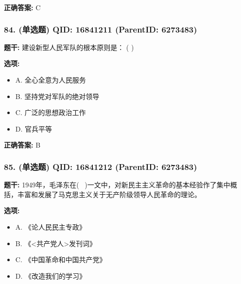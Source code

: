 \documentclass[12pt,UTF8]{ctexart}
\begin{document}
\textbf{正确答案:}
C

\vspace{0.3em}\hrulefill\vspace{0.7em}

\subsubsection*{84. (单选题) \small QID: 16841211 (ParentID: 6273483)}

\textbf{题干:}
建设新型人民军队的根本原则是： ( )



\textbf{选项:}
\begin{itemize}[leftmargin=*]

  \item A. 全心全意为人民服务

  \item B. 坚持党对军队的绝对领导

  \item C. 广泛的思想政治工作

  \item D. 官兵平等

\end{itemize}

\textbf{正确答案:}
B

\vspace{0.3em}\hrulefill\vspace{0.7em}

\subsubsection*{85. (单选题) \small QID: 16841212 (ParentID: 6273483)}

\textbf{题干:}
1949年，毛泽东在(  )一文中，对新民主主义革命的基本经验作了集中概括，丰富和发展了马克思主义关于无产阶级领导人民革命的理论。



\textbf{选项:}
\begin{itemize}[leftmargin=*]

  \item A. 《论人民民主专政》

  \item B. 《<共产党人>发刊词》

  \item C. 《中国革命和中国共产党》

  \item D. 《改造我们的学习》

\end{itemize}
\end{document}
